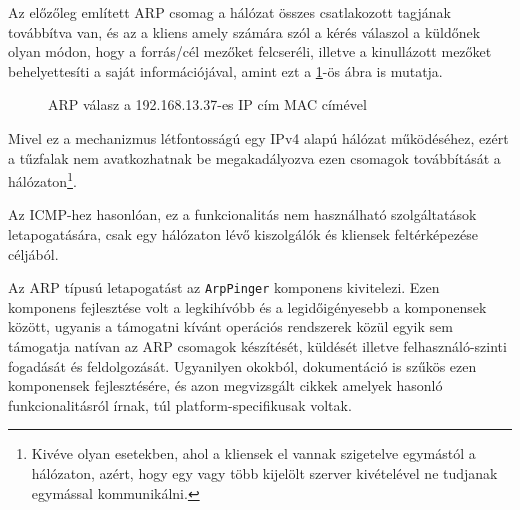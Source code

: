 \documentclass[a4paper,12pt]{article}
\newcounter{subsubsubsection}[subsubsection]
\begin{document}
	Az előzőleg említett ARP csomag a hálózat összes csatlakozott tagjának továbbítva van, és az a kliens amely számára szól a kérés válaszol a küldőnek olyan módon, hogy a forrás/cél mezőket felcseréli, illetve a kinullázott mezőket behelyettesíti a saját információjával, amint ezt a \ref{arpresp}-ös ábra is mutatja. 
	
	\begin{figure}[!htbp]
		\centering
		\caption{ARP válasz a 192.168.13.37-es IP cím MAC címével}
		\label{arpresp}
	\end{figure}

	Mivel ez a mechanizmus létfontosságú egy IPv4 alapú hálózat működéséhez, ezért a tűzfalak nem avatkozhatnak be megakadályozva ezen csomagok továbbítását a hálózaton\footnote{Kivéve olyan esetekben, ahol a kliensek el vannak szigetelve egymástól a hálózaton, azért, hogy egy vagy több kijelölt szerver kivételével ne tudjanak egymással kommunikálni.}.
	
	Az ICMP-hez hasonlóan, ez a funkcionalitás nem használható szolgáltatások letapogatására, csak egy hálózaton lévő kiszolgálók és kliensek feltérképezése céljából.
	

	Az ARP típusú letapogatást az \texttt{ArpPinger} komponens kivitelezi. Ezen komponens fejlesztése volt a legkihívóbb és a legidőigényesebb a komponensek között, ugyanis a támogatni kívánt operációs rendszerek közül egyik sem támogatja natívan az ARP csomagok készítését, küldését illetve felhasználó-szinti fogadását és feldolgozását. Ugyanilyen okokból, dokumentáció is szűkös ezen komponensek fejlesztésére, és azon megvizsgált cikkek amelyek hasonló funkcionalitásról írnak, túl platform-specifikusak voltak.
	
\end{document}
